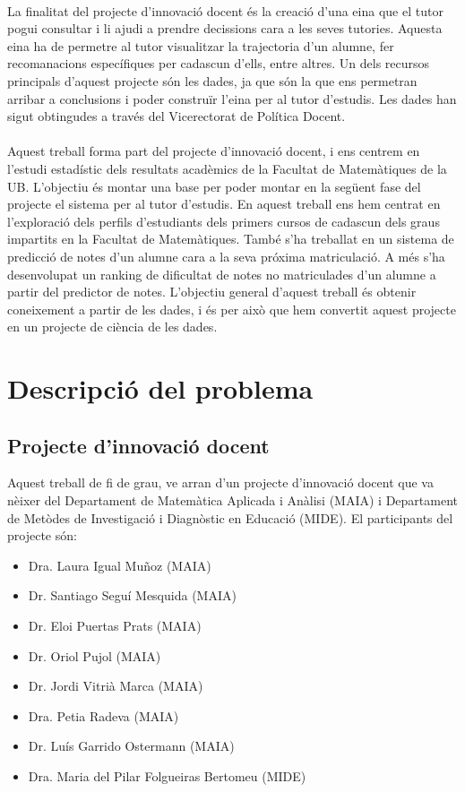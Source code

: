 \documentclass[12pt,a4paper,catalan]{article}
\begin{document}
\\
La finalitat del projecte d'innovació docent és la creació d'una eina que el tutor pogui consultar i li ajudi a prendre decissions cara a les seves tutories. Aquesta eina ha de permetre al tutor visualitzar la trajectoria d'un alumne, fer recomanacions específiques per cadascun d'ells, entre altres. Un dels recursos principals d'aquest projecte són les dades, ja que són la que ens permetran arribar a conclusions i poder construïr l'eina per al tutor d'estudis. Les dades han sigut obtingudes a través del Vicerectorat de Política Docent.
\\
\\
Aquest treball forma part del projecte d'innovació docent, i ens centrem en l'estudi estadístic dels resultats acadèmics de la Facultat de Matemàtiques de la UB. L'objectiu és montar una base per poder montar en la següent fase del projecte el sistema per al tutor d'estudis. En aquest treball ens hem centrat en l'exploració dels perfils d'estudiants dels primers cursos de cadascun dels graus impartits en la Facultat de Matemàtiques. També s'ha treballat en un sistema de predicció de notes d'un alumne cara a la seva próxima matriculació. A més s'ha desenvolupat un ranking de dificultat de notes no matriculades d'un alumne a partir del predictor de notes. L'objectiu general d'aquest treball és obtenir coneixement a partir de les dades, i és per això que hem convertit aquest projecte en un projecte de ciència de les dades.


\newpage


\section{Descripció del problema}
\subsection{Projecte d'innovació docent}
Aquest treball de fi de grau, ve arran d'un projecte d'innovació docent que va nèixer del Departament de Matemàtica Aplicada i Anàlisi (MAIA) i Departament de Metòdes de Investigació i Diagnòstic en Educació (MIDE). El participants del projecte són:
\begin{itemize}[leftmargin=.5in]
	\item Dra. Laura Igual Muñoz (MAIA)
	\item Dr. Santiago Seguí Mesquida (MAIA)
	\item Dr. Eloi Puertas Prats (MAIA)
	\item Dr. Oriol Pujol (MAIA)
	\item Dr. Jordi Vitrià Marca (MAIA)
	\item Dra. Petia Radeva (MAIA)
	\item Dr. Luís Garrido Ostermann (MAIA)
	\item Dra. Maria  del Pilar Folgueiras Bertomeu (MIDE)
\end{itemize}
\end{document}
